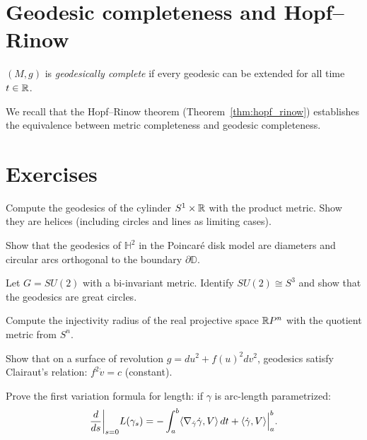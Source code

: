 \section{Geodesic completeness and Hopf--Rinow}

\begin{definition}
$(M, g)$ is \emph{geodesically complete} if every geodesic can be extended for
all time $t \in \mathbb{R}$.
\end{definition}

We recall that the Hopf--Rinow theorem (Theorem~\ref{thm:hopf_rinow}) establishes
the equivalence between metric completeness and geodesic completeness.

\section{Exercises}

\begin{exercise}
Compute the geodesics of the cylinder $S^1 \times \mathbb{R}$ with the product metric.
Show they are helices (including circles and lines as limiting cases).
\end{exercise}

\begin{exercise}
Show that the geodesics of $\mathbb{H}^2$ in the Poincar\'e disk model are
diameters and circular arcs orthogonal to the boundary $\partial\mathbb{D}$.
\end{exercise}

\begin{exercise}
Let $G = SU(2)$ with a bi-invariant metric. Identify $SU(2) \cong S^3$ and show
that the geodesics are great circles.
\end{exercise}

\begin{exercise}
Compute the injectivity radius of the real projective space $\mathbb{R} P^n$ with the
quotient metric from $S^n$.
\end{exercise}

\begin{exercise}
Show that on a surface of revolution $g = du^2 + f(u)^2 dv^2$, geodesics satisfy
Clairaut's relation: $f^2 \dot v = c$ (constant).
\end{exercise}

\begin{exercise}
Prove the first variation formula for length: if $\gamma$ is arc-length
parametrized:
\[
    \frac{d}{ds}\bigg|_{s=0} L(\gamma_s)
    = -\int_a^b \langle \nabla_{\dot\gamma}\dot\gamma, V \rangle\, dt
    + \langle \dot\gamma, V \rangle\Big|_a^b.
\]
\end{exercise}
